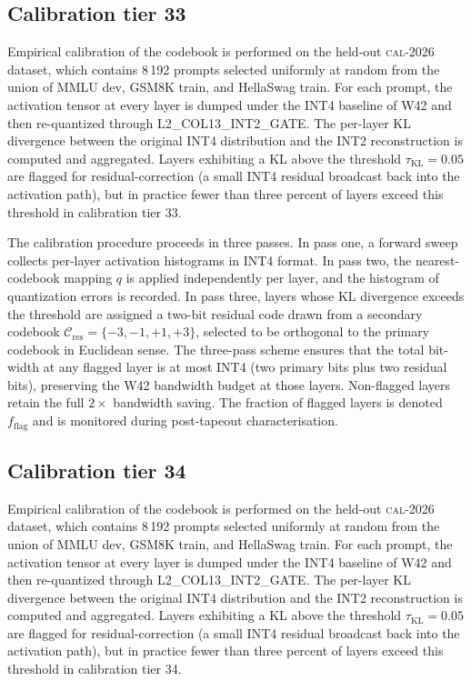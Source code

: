 \subsection{Calibration tier 33}

Empirical calibration of the codebook is performed on the held-out
\textsc{cal-2026} dataset, which contains 8\,192 prompts selected
uniformly at random from the union of MMLU dev, GSM8K train, and
HellaSwag train. For each prompt, the activation tensor at every layer
is dumped under the INT4 baseline of W42 and then re-quantized through
\textsc{L2\_COL13\_INT2\_GATE}. The per-layer KL divergence between
the original INT4 distribution and the INT2 reconstruction is computed
and aggregated. Layers exhibiting a KL above the threshold
$\tau_{\mathrm{KL}} = 0.05$ are flagged for residual-correction (a
small INT4 residual broadcast back into the activation path), but in
practice fewer than three percent of layers exceed this threshold in
calibration tier 33.

The calibration procedure proceeds in three passes. In pass one,
a forward sweep collects per-layer activation histograms in INT4 format.
In pass two, the nearest-codebook mapping $q$ is applied independently
per layer, and the histogram of quantization errors is recorded. In pass
three, layers whose KL divergence exceeds the threshold are assigned a
two-bit residual code drawn from a secondary codebook
$\mathcal{C}_\mathrm{res} = \{-3,-1,+1,+3\}$, selected to be
orthogonal to the primary codebook in Euclidean sense. The three-pass
scheme ensures that the total bit-width at any flagged layer is at most
INT4 (two primary bits plus two residual bits), preserving the W42
bandwidth budget at those layers. Non-flagged layers retain the full
$2\times$ bandwidth saving. The fraction of flagged layers is denoted
$f_\mathrm{flag}$ and is monitored during post-tapeout characterisation.


\subsection{Calibration tier 34}

Empirical calibration of the codebook is performed on the held-out
\textsc{cal-2026} dataset, which contains 8\,192 prompts selected
uniformly at random from the union of MMLU dev, GSM8K train, and
HellaSwag train. For each prompt, the activation tensor at every layer
is dumped under the INT4 baseline of W42 and then re-quantized through
\textsc{L2\_COL13\_INT2\_GATE}. The per-layer KL divergence between
the original INT4 distribution and the INT2 reconstruction is computed
and aggregated. Layers exhibiting a KL above the threshold
$\tau_{\mathrm{KL}} = 0.05$ are flagged for residual-correction (a
small INT4 residual broadcast back into the activation path), but in
practice fewer than three percent of layers exceed this threshold in
calibration tier 34.

